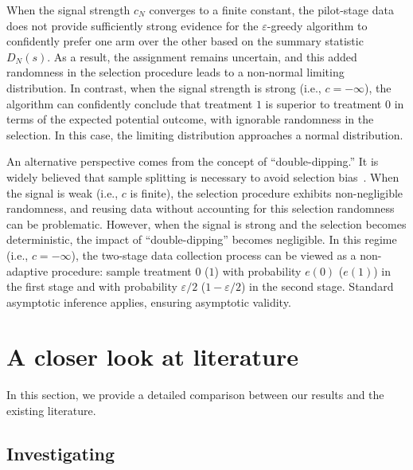 \documentclass[12pt]{article}
\begin{document}
When the signal strength $c_N$ converges to a finite constant, the pilot-stage data does not provide sufficiently strong evidence for the $\varepsilon$-greedy algorithm to confidently prefer one arm over the other based on the summary statistic $D_N(s)$. As a result, the assignment remains uncertain, and this added randomness in the selection procedure leads to a non-normal limiting distribution. In contrast, when the signal strength is strong (i.e., $c = -\infty$), the algorithm can confidently conclude that treatment $1$ is superior to treatment $0$ in terms of the expected potential outcome, with ignorable randomness in the selection. In this case, the limiting distribution approaches a normal distribution.

An alternative perspective comes from the concept of ``double-dipping.'' It is widely believed that sample splitting is necessary to avoid selection bias~\citep{fithian2014optimal}. When the signal is weak (i.e., $c$ is finite), the selection procedure exhibits non-negligible randomness, and reusing data without accounting for this selection randomness can be problematic. However, when the signal is strong and the selection becomes deterministic, the impact of ``double-dipping'' becomes negligible. In this regime (i.e., $c = -\infty$), the two-stage data collection process can be viewed as a non-adaptive procedure: sample treatment $0$ ($1$) with probability $e(0)$ ($e(1)$) in the first stage and with probability $\varepsilon/2$ ($1 - \varepsilon/2$) in the second stage. Standard asymptotic inference applies, ensuring asymptotic validity. 

\section{A closer look at literature}\label{sec:inspection_literature}
In this section, we provide a detailed comparison between our results and the existing literature.



\subsection{Investigating \citet{Zhang2020}}\label{sec:inspection_Kelly}
\end{document}

